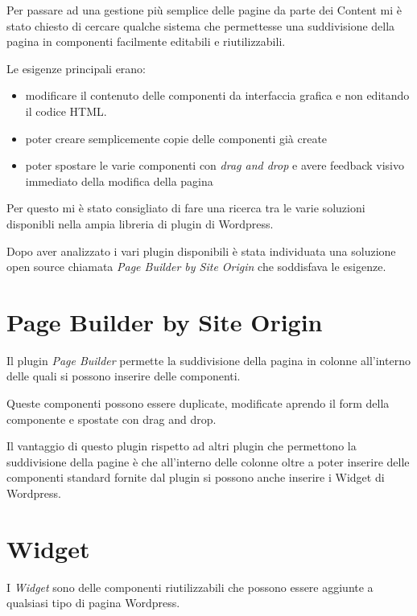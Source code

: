 


Per passare ad una gestione più semplice delle pagine da parte dei Content
mi è stato chiesto di cercare qualche sistema che permettesse una suddivisione
della pagina in componenti facilmente editabili e riutilizzabili.

Le esigenze principali erano:
\begin{itemize}
\item modificare il contenuto delle componenti da interfaccia grafica e non 
editando il codice HTML.
\item poter creare semplicemente copie delle componenti già create
\item poter spostare le varie componenti con \emph{drag and drop} e avere
feedback visivo immediato della modifica della pagina
\end{itemize}

Per questo mi è stato consigliato di fare una ricerca tra le varie soluzioni disponibli
nella ampia libreria di plugin di Wordpress.


Dopo aver analizzato i vari plugin disponibili è stata individuata una soluzione open source chiamata \emph{Page Builder by
Site Origin}\cite{PB} che soddisfava le esigenze.

\section{Page Builder by Site Origin}

Il plugin \emph{Page Builder} permette la suddivisione della pagina in colonne all'interno delle quali
si possono inserire delle componenti.

Queste componenti possono essere duplicate, modificate aprendo il form della componente e spostate
con drag and drop.


Il vantaggio di questo plugin rispetto ad altri plugin che permettono la suddivisione della pagine è che all'interno delle colonne
oltre a poter inserire delle componenti standard fornite dal plugin si possono anche inserire i Widget di Wordpress.

\section{Widget}
I \emph{Widget} sono delle componenti riutilizzabili che possono essere aggiunte a qualsiasi
tipo di pagina Wordpress. 

